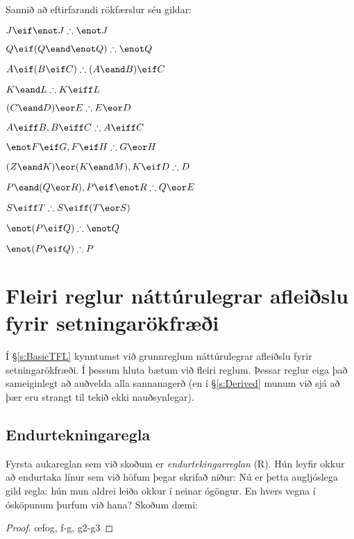 \problempart
\label{pr.solvedTFLproofs}
Sannið að eftirfarandi rökfærslur séu gildar:
\begin{earg}
\item $J\eif\enot J \therefore \enot J$
\item $Q\eif(Q\eand\enot Q) \therefore \enot Q$
\item $A\eif (B\eif C) \therefore (A\eand B)\eif C$
\item $K\eand L \therefore K\eiff L$
\item $(C\eand D)\eor E \therefore E\eor D$
\item $A\eiff B, B\eiff C \therefore A\eiff C$
\item $\enot F\eif G, F\eif H \therefore G\eor H$
\item $(Z\eand K) \eor (K\eand M), K \eif D \therefore D$
\item $P \eand (Q\eor R), P\eif \enot R \therefore Q\eor E$
\item $S\eiff T \therefore S\eiff (T\eor S)$
\item $\enot (P \eif Q) \therefore \enot Q$
\item $\enot (P \eif Q) \therefore P$
\end{earg}


\chapter{Fleiri reglur náttúrulegrar afleiðslu fyrir setningarökfræði}\label{s:Further}

Í \S\ref{s:BasicTFL} kynntumst við grunnreglum náttúrulegrar afleiðslu fyrir setningarökfræði. Í þessum hluta bætum við fleiri reglum. Þessar reglur eiga það sameiginlegt að auðvelda alla sannanagerð (en í \S\ref{s:Derived} munum við sjá að þær eru strangt til tekið ekki nauðsynlegar).

\section{Endurtekningaregla}

Fyrsta aukareglan sem við skoðum er \emph{endurtekingarreglan} (R). Hún leyfir okkur að endurtaka línur sem við höfum þegar skrifað niður:
Nú er þetta augljóslega gild regla: hún mun aldrei leiða okkur í neinar ógöngur. En hvers vegna í ósköpunum þurfum við hana? Skoðum dæmi:
\begin{proof}
	\open
	\close
	\open
	\close
	\oe{fog, f-g, g2-g3}
\end{proof}

